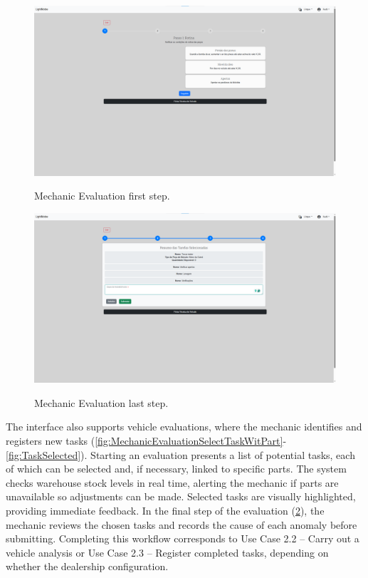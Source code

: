 \begin{figure}[h]
  \caption{Mechanic Evaluation first step.}
  \centering
  \includegraphics[width=\textwidth]{figs/Implementation/mechanic/MechanicEvaluationNormal}
  \label{fig:MechanicEvaluationNormal}
\end{figure}





\begin{figure}[h]
  \caption{Mechanic Evaluation last step.}
  \centering
  \includegraphics[width=\textwidth]{figs/Implementation/mechanic/EvaluationLastStep}
  \label{fig:EvaluationLastStep}
\end{figure}

The interface also supports vehicle evaluations, where the mechanic identifies and registers new tasks (\ref{fig:MechanicEvaluationSelectTaskWitPart}-\ref{fig:TaskSelected}). Starting an evaluation presents a list of potential tasks, each of which can be selected and, if necessary, linked to specific parts. The system checks warehouse stock levels in real time, alerting the mechanic if parts are unavailable so adjustments can be made. Selected tasks are visually highlighted, providing immediate feedback. In the final step of the evaluation (\ref{fig:EvaluationLastStep}), the mechanic reviews the chosen tasks and records the cause of each anomaly before submitting. Completing this workflow corresponds to Use Case 2.2 – Carry out a vehicle analysis or Use Case 2.3 – Register completed tasks, depending on whether the dealership configuration.


